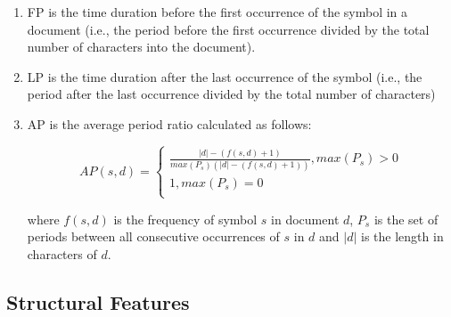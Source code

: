 \begin{enumerate}
\item FP is the time duration before the first occurrence of the symbol in a document (i.e., the period before the first occurrence divided by the total number of characters into the document).
\item LP is the time duration after the last occurrence of the symbol (i.e., the period after the last occurrence divided by the total number of characters)
\item AP is the average period ratio calculated as follows:

\begin{equation}\label{chap:relevant_work:sec:word_embendding}
	AP(s,d)  =
      \begin{cases}
        \frac{\vert d \vert - (f(s,d) +1)}{max(P_s)(\vert d \vert - (f(s,d) +1))}, max(P_s) > 0  \\
        1, max(P_s) = 0 \\ 
       \end{cases}
\end{equation}

\noindent
where $f(s,d)$ is the frequency of symbol $s$ in document $d$, $P_s$ is the set of periods between all consecutive occurrences of $s$ in $d$ and $\vert d \vert$ is the length in characters of $d$. 

\end{enumerate}


\subsection{Structural Features}

